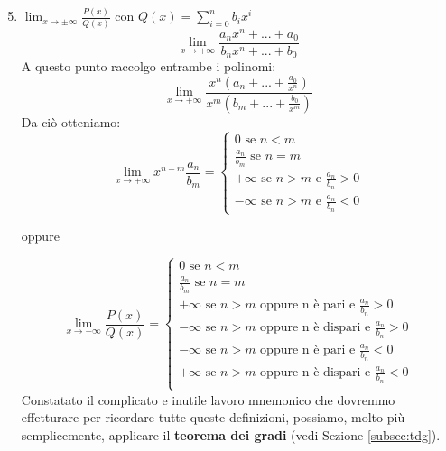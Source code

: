     \begin{enumerate}[label=\textbf{\arabic*})]\setcounter{enumi}{4}
        \item $\lim_{x\to\pm\infty}\frac{P(x)}{Q(x)}$ con $Q(x)=\sum_{i=0}^{n}b_ix^i$
        \begin{equation*}
            \lim_{x\to+\infty}\frac{a_nx^n+...+a_0}{b_nx^n+...+b_0}
        \end{equation*}
        A questo punto raccolgo entrambe i polinomi:
        \begin{equation*}
            \lim_{x\to+\infty}\frac{x^n(a_n+...+\frac{a_0}{x^n})}{x^m(b_m+...+\frac{b_0}{x^m})}
        \end{equation*}
        Da ciò otteniamo:
        \begin{equation*}
            \lim_{x\to+\infty}x^{n-m}\frac{a_n}{b_m}=\begin{cases}
                0 \text{ se } n<m\\
                \frac{a_n}{b_m} \text{ se } n=m\\
                +\infty \text{ se } n>m \text{ e } \frac{a_n}{b_n}>0\\
                -\infty \text{ se } n>m \text{ e } \frac{a_n}{b_n}<0
            \end{cases}
        \end{equation*}
        \begin{center}
            oppure
        \end{center}
        \begin{equation*}
            \lim_{x\to-\infty}\frac{P(x)}{Q(x)}=\begin{cases}
                0 \text{ se } n<m\\
                \frac{a_n}{b_m} \text{ se } n=m\\
                +\infty \text{ se } n>m \text{ oppure n è pari e } \frac{a_n}{b_n}>0\\
                -\infty \text{ se } n>m \text{ oppure n è dispari e } \frac{a_n}{b_n}>0\\
                -\infty \text{ se } n>m \text{ oppure n è pari e } \frac{a_n}{b_n}<0\\
                +\infty \text{ se } n>m \text{ oppure n è dispari e } \frac{a_n}{b_n}<0\\
            \end{cases}
        \end{equation*}
        Constatato il complicato e inutile lavoro mnemonico che dovremmo effetturare per ricordare tutte queste definizioni, possiamo, molto più semplicemente, applicare il \textbf{teorema dei gradi} (vedi Sezione \ref{subsec:tdg}).
    

\end{enumerate}
